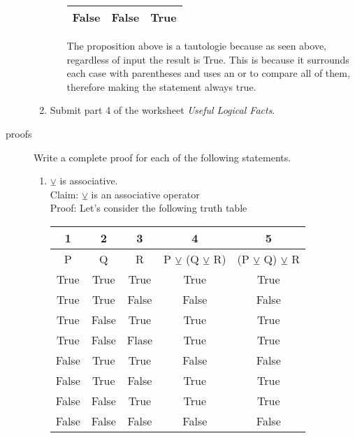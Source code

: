 \documentclass{letter}
\begin{document}
\begin{description}
\begin{enumerate}
\begin{enumerate}
\begin{center}
\begin{tabular}{||c|c|c||}
                                    False & False & True \\ \hline
                                    \end{tabular}
                                    \end{center}
The proposition above is a tautologie because as seen above, regardless of input the result is True. This is because it surrounds each case with parentheses and uses an or to compare all of them, therefore making the statement always true.
			\end{enumerate}
	\item Submit part 4 of the worksheet {\em Useful Logical Facts}.
\end{enumerate}
\item[proofs] Write a complete proof for each of the following statements.
	\begin{enumerate}
		\item $\veebar$ is associative. \\
                  Claim: $\veebar$ is an associative operator \\
                  Proof: Let's consider the following truth table \\
                  \begin{center}
                                    \begin{tabular}{||c|c|c|c|c||}
                                      1 & 2 & 3 & 4 & 5 \\
                                    \hline
                                    P & Q & R & P $\veebar$ (Q $\veebar$ R) & (P $\veebar$ Q) $\veebar$ R\\ \hline
                                    True & True & True & True & True\\ \hline
                                    True & True & False & False & False\\ \hline
                                    True & False & True & True & True\\ \hline
                                    True & False & Flase & True & True\\ \hline
                                    False & True & True & False & False\\ \hline
                                    False & True & False & True & True\\ \hline
                                    False & False & True  & True & True\\ \hline
                                    False & False & False  & False& False\\

\end{tabular}
\end{center}
\end{enumerate}
\end{description}
\end{document}
